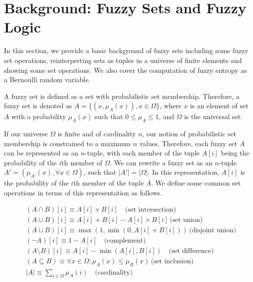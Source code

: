 \documentclass[11pt]{book}
\newcommand{\card}[1]{\left| #1 \right|}
\begin{document}
\section{Background: Fuzzy Sets and Fuzzy Logic} \label{sec: math}

In this section, we provide a basic background of fuzzy sets including some
fuzzy set operations, reinterpreting sets as tuples in a universe of finite
elements and showing some set operations. We also cover the computation of
fuzzy entropy as a Bernoulli random variable. 

A fuzzy set is defined as a set with probabilistic set membership. Therefore, a
fuzzy set is denoted as $A = \{ (x, \mu_A(x)), x \in \Omega\}$,  where $x$ is
an element of set $A$ with a probability $\mu_A(x)$ such that $0 \leq \mu_A
\leq 1$, and $\Omega$ is the universal set. 

If our universe $\Omega$ is finite and of cardinality $n$, our notion of
probabilistic set membership is constrained to a maximum $n$ values. Therefore,
each fuzzy set $A$ can be represented as an $n$-tuple, with each member of the
tuple $A[i]$ being the probability of the $i$th member of $\Omega$. We can
rewrite a fuzzy set as an $n$-tuple $A' = ( \mu_{A'}(x), \forall x \in \Omega
)$, such that $\card{A'} = \card \Omega$. In this representation, $A[i]$ is the
probability of the $i$th member of the tuple $A$. We define some common set
operations in terms of this representation as follows.

{\footnotesize \begin{align*} &(A \cap B)[i] \equiv  A[i] \times B[i] \quad
\text{(set intersection)} \\ &(A \cup B)[i] \equiv  A[i] + B[i]  - A[i] \times
B[i] \, \text{(set union)}\\ &(A \sqcup B)[i] \equiv  \max(1, \min(0, A[i] +
B[i])) \, \text{(disjoint union)}\\ &(\lnot A)[i] \equiv 1 - A[i] \quad
\text{(complement)}\\ &(A \setminus B)[i] \equiv A[i]  - \min(A[i], B[i]) \quad
\text{(set difference)} \\ &(A \subseteq B) \equiv \forall x \in \Omega:
\mu_A(x) \leq \mu_B(x) \, \text{(set inclusion)}\\ &\card A \equiv \sum_{i \in
\Omega} \mu_A (i) \quad \text{(cardinality)} \\
\end{align*} }
\end{document}
